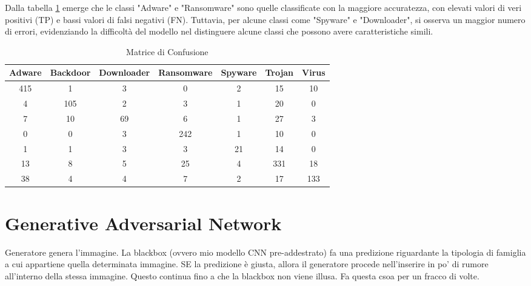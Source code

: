 Dalla tabella \ref{tab:confusion_matrix} emerge che le classi "Adware" e "Ransomware" sono quelle classificate con la maggiore accuratezza, con elevati valori di veri positivi (TP) e bassi valori di falsi negativi (FN). Tuttavia, per alcune classi come "Spyware" e "Downloader", si osserva un maggior numero di errori, evidenziando la difficoltà del modello nel distinguere alcune classi che possono avere caratteristiche simili.
\begin{table}[h]
    \centering
    \begin{tabular}{|c|c|c|c|c|c|c|}
    \hline
    \textbf{Adware} & \textbf{Backdoor} & \textbf{Downloader} & \textbf{Ransomware} & \textbf{Spyware} & \textbf{Trojan} & \textbf{Virus} \\
    \hline
    415 & 1  & 3  & 0  & 2  & 15 & 10 \\
    \hline
    4   & 105 & 2  & 3  & 1  & 20 & 0  \\
    \hline
    7   & 10  & 69 & 6  & 1  & 27 & 3  \\
    \hline
    0   & 0   & 3  & 242 & 1  & 10 & 0  \\
    \hline
    1   & 1   & 3  & 3   & 21 & 14 & 0  \\
    \hline
    13  & 8   & 5  & 25  & 4  & 331 & 18 \\
    \hline
    38  & 4   & 4  & 7   & 2  & 17 & 133 \\
    \hline
    \end{tabular}
    \caption{Matrice di Confusione}
    \label{tab:confusion_matrix}
\end{table}
    
\newpage
\section{Generative Adversarial Network}
Generatore genera l'immagine. La blackbox (ovvero mio modello CNN pre-addestrato) fa una predizione riguardante la tipologia di famiglia a cui appartiene quella determinata immagine. SE la predizione è giusta, allora il generatore procede nell'inserire in po' di rumore all'interno della stessa immagine. Questo continua fino a che la blackbox non viene illusa. Fa questa csoa per un fracco di volte.
